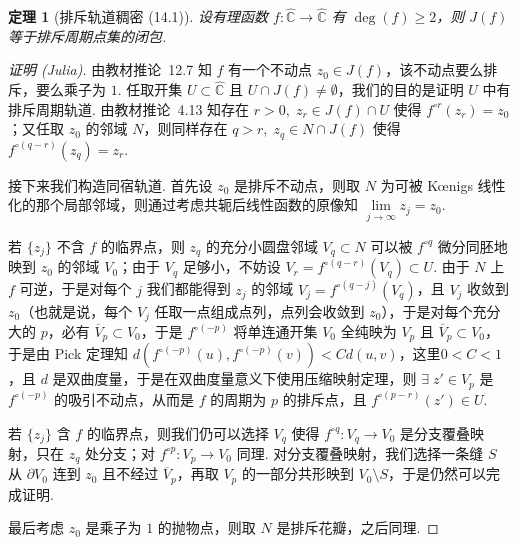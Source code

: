 \documentclass[11pt, a4paper, oneside]{ctexart}
\newtheorem{theorem}{定理}[section]
\newcommand{\C}{\mathbb{C}}
\begin{document}
    \begin{theorem}[排斥轨道稠密 (14.1)]\label{定理14.1}
        设有理函数 $f:\hat{\C}\to\hat{\C}$ 有 $\deg(f)\geq 2$，则 $J(f)$ 等于排斥周期点集的闭包.
    \end{theorem}
    \begin{proof}[证明 (Julia)]
        由教材推论~12.7 知 $f$ 有一个不动点 $z_0\in J(f)$，该不动点要么排斥，要么乘子为 $1$. 任取开集 $U\subset \hat{\C}$ 且 $U\cap J(f)\neq \emptyset$，我们的目的是证明 $U$ 中有排斥周期轨道. 由教材推论~4.13 知存在 $r>0,\;z_r\in J(f)\cap U$ 使得 $f^{\circ r}(z_r)=z_0$；又任取 $z_0$ 的邻域 $N$，则同样存在 $q>r,\; z_q\in N\cap J(f)$ 使得 $f^{\circ (q-r)}(z_q)=z_r$.

        接下来我们构造同宿轨道. 首先设 $z_0$ 是排斥不动点，则取 $N$ 为可被 Kœnigs 线性化的那个局部邻域，则通过考虑共轭后线性函数的原像知 $\lim\limits_{j\to\infty}z_j=z_0$.
        
        若 $\{z_j\}$ 不含 $f$ 的临界点，则 $z_q$ 的充分小圆盘邻域 $V_q\subset N$ 可以被 $f^{\circ q}$ 微分同胚地映到 $z_0$ 的邻域 $V_0$；由于 $V_q$ 足够小，不妨设 $V_r=f^{\circ (q-r)}(V_q)\subset U$. 由于 $N$ 上 $f$ 可逆，于是对每个 $j$ 我们都能得到 $z_j$ 的邻域 $V_j=f^{\circ(q-j)}(V_q)$，且 $V_j$ 收敛到 $z_0$（也就是说，每个 $V_j$ 任取一点组成点列，点列会收敛到 $z_0$），于是对每个充分大的 $p$，必有 $\overline{V}_p\subset V_0$，于是 $f^{\circ(-p)}$ 将单连通开集 $V_0$ 全纯映为 $V_p$ 且 $\overline{V}_p\subset V_0$，于是由 Pick 定理知 $d(f^{\circ(-p)}(u),f^{\circ(-p)}(v))<Cd(u,v)$，这里$0<C<1$，且 $d$ 是双曲度量，于是在双曲度量意义下使用压缩映射定理，则 $\exists\; z'\in V_p$ 是 $f^{\circ(-p)}$ 的吸引不动点，从而是 $f$ 的周期为 $p$ 的排斥点，且 $f^{\circ (p-r)}(z')\in U$.

        若 $\{z_j\}$ 含 $f$ 的临界点，则我们仍可以选择 $V_q$ 使得 $f^{\circ q}:V_q\to V_0$ 是分支覆叠映射，只在 $z_q$ 处分支；对 $f^{\circ p}:V_p\to V_0$ 同理. 对分支覆叠映射，我们选择一条缝 $S$ 从 $\partial V_0$ 连到 $z_0$ 且不经过 $\overline{V}_p$，再取 $V_p$ 的一部分共形映到 $V_0\setminus S$，于是仍然可以完成证明.

        最后考虑 $z_0$ 是乘子为 $1$ 的抛物点，则取 $N$ 是排斥花瓣，之后同理.
    \end{proof}
\end{document}

